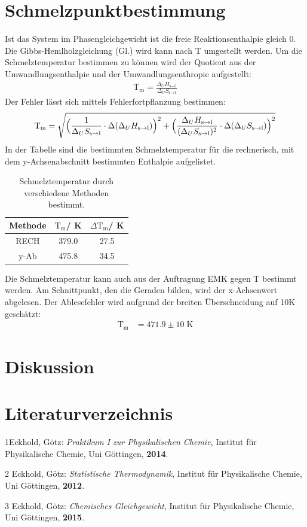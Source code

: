 \documentclass[12pt,a4paper,titlepage,headinclude,bibtotoc]{scrartcl}
\begin{document}
\section{Schmelzpunktbestimmung}
Ist das System im Phasengleichgewicht ist die freie Reaktionsenthalpie gleich 0. Die Gibbs-Hemlholzgleichung (Gl.) wird kann nach T umgestellt werden. Um die Schmelztemperatur bestimmen zu können wird der Quotient aus der Umwandlungsenthalpie und der Umwandlungsenthropie aufgestellt:
\begin{align}
\text{T}_{\text{m}}= \frac{\Delta_U H_{\text{s}\rightarrow\text{l}}}{\Delta_U S_{\text{s}\rightarrow\text{l}}}
\end{align}
Der Fehler lässt sich mittels Fehlerfortpflanzung bestimmen:
\begin{align}
\text{T}_{\text{m}}= \sqrt{\Bigl(\frac{1}{\Delta_U S_{\text{s}\rightarrow\text{l}}}\cdot \Delta(\Delta_U H_{\text{s}\rightarrow\text{l}})\Bigr)^2+\Bigl(\frac{\Delta_U H_{\text{s}\rightarrow\text{l}}}{(\Delta_U S_{\text{s}\rightarrow\text{l}})^2}\cdot \Delta(\Delta_U S_{\text{s}\rightarrow\text{l}})\Bigr)^2}
\end{align}
In der Tabelle\; sind die bestimmten Schmelztemperatur für die rechnerisch, mit dem y-Achsenabschnitt bestimmten Enthalpie aufgelistet.
\begin{table}[h]
\centering
\caption{Schmelztemperatur durch verschiedene Methoden bestimmt.}
\begin{tabular}{c|c|c}
Methode & $\text{T}_{\text{m}}$/ K& $\Delta\text{T}_{\text{m}}$/ K \\
\hline
RECH &379.0 &27.5 \\
y-Ab&475.8 & 34.5\\
\end{tabular}
\end{table}
\FloatBarrier
Die Schmelztemperatur kann auch aus der Auftragung EMK gegen T bestimmt werden. Am Schnittpunkt, den die Geraden bilden, wird der x-Achsenwert abgelesen. Der Ablesefehler wird aufgrund der breiten Überschneidung auf 10\;K geschätzt:
\begin{align}
\text{T}_{\text{m}}&= 471.9 \pm 10\;\text{K}
\end{align}
\section{Diskussion}
\newpage
\section{Literaturverzeichnis}
1\quad Eckhold, Götz: \emph{Praktikum I zur Physikalischen Chemie}, Institut für Physikalische Chemie, Uni Göttingen, \textbf{2014}.

\vspace{0,5 cm}
2 \quad Eckhold, Götz: \emph{Statistische Thermodynamik}, Institut für Physikalische Chemie, Uni Göttingen, \textbf{2012}.

\vspace{0,5cm}
3 \quad Eckhold, Götz: \emph{Chemisches Gleichgewicht}, Institut für Physikalische Chemie, Uni Göttingen, \textbf{2015}.\\
\end{document}
